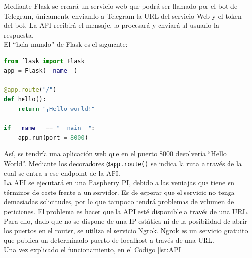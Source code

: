 Mediante Flask se creará un servicio web que podrá ser llamado por el bot de Telegram, únicamente enviando a Telegram la URL del servicio Web y el token del bot. La API recibirá el mensaje, lo procesará y enviará al usuario la respuesta.\\

El ``hola mundo'' de Flask es el siguiente:

\begin{lstlisting}[language=Python, caption= Aplicación Web básica creada con Flask \cite{wiki:FlaskHelloWorld}.]
from flask import Flask
app = Flask(__name__)

@app.route("/")
def hello():
    return "¡Hello world!"

if __name__ == "__main__":
    app.run(port = 8000)
\end{lstlisting}

Así, se tendría una aplicación web que en el puerto $8000$ devolvería ``Hello World''. Mediante los decoradores \texttt{@app.route()} se indica la ruta a través de la cual se entra a ese endpoint de la API.\\

La API se ejecutará en una Raspberry PI, debido a las ventajas que tiene en términos de coste frente a un servidor. Es de esperar que el servicio no tenga demasiadas solicitudes, por lo que tampoco tendrá problemas de volumen de peticiones. El problema es hacer que la API esté disponible a través de una URL. Para ello, dado que no se dispone de una IP estática ni de la posibilidad de abrir los puertos en el router, se utiliza el servicio \href{https://ngrok.com/}{Ngrok}. Ngrok es un servicio gratuito que publica un determinado puerto de localhost a través de una URL.\\

Una vez explicado el funcionamiento, en el Cödigo \ref{lst:API}

